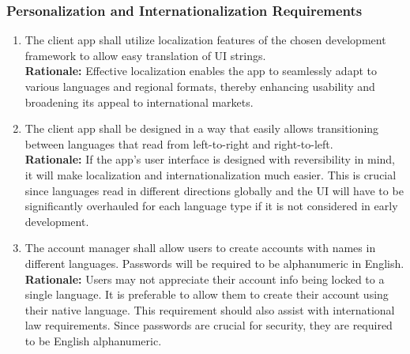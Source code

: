 \documentclass[]{article}
\begin{document}
\subsubsection{Personalization and Internationalization Requirements}
\label{ssub:personalization_and_internationalization_requirements}
\begin{enumerate}[{UH-PI}1. ]
	\item The client app shall utilize localization features of the chosen development framework to allow easy translation of UI strings.\\
	\textbf{Rationale:} Effective localization enables the app to seamlessly adapt to various languages and regional formats, thereby enhancing usability and broadening its appeal to international markets.
	\item The client app shall be designed in a way that easily allows transitioning between languages that read from left-to-right and right-to-left.\\
	\textbf{Rationale:} If the app's user interface is designed with reversibility in mind, it will make localization and internationalization much easier. This is crucial
	since languages read in different directions globally and the UI will have to be significantly overhauled for each language type if it is not considered in early development. 
	\item The account manager shall allow users to create accounts with names in different languages. Passwords will be required to be alphanumeric in English.\\
	\textbf{Rationale:} Users may not appreciate their account info being locked to a single language. It is preferable to allow them to create their account using their native language.
	This requirement should also assist with international law requirements. Since passwords are crucial for security, they are required to be English alphanumeric.
\end{enumerate}
\end{document}

